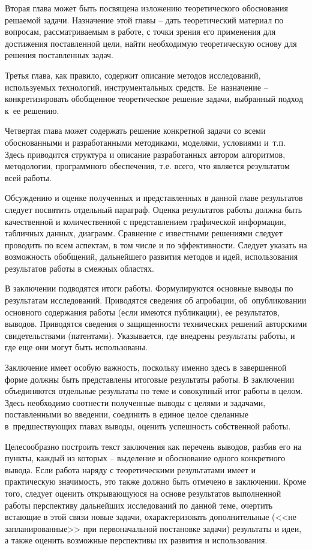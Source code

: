 \documentclass[PI,VKR]{HSEUniversityPractice}
\begin{document}
Вторая глава может быть посвящена изложению теоретического обоснования решаемой задачи. Назначение этой главы – дать теоретический материал по вопросам, рассматриваемым в работе, с точки зрения его применения для достижения поставленной цели, найти необходимую теоретическую основу для решения поставленных задач.

Третья глава, как правило, содержит описание методов исследований, используемых технологий, инструментальных средств. Ее назначение – конкретизировать обобщенное теоретическое решение задачи, выбранный подход к ее решению.

Четвертая глава может содержать решение конкретной задачи со всеми обоснованными и разработанными методиками, моделями, условиями и т.п. Здесь приводится структура и описание разработанных автором алгоритмов, методологии, программного обеспечения, т.е. всего, что является результатом всей работы.

Обсуждению и оценке полученных и представленных в данной главе результатов следует посвятить отдельный параграф. Оценка результатов работы должна быть качественной и количественной с представлением графической информации, табличных данных, диаграмм. Сравнение с известными решениями следует проводить по всем аспектам, в том числе и по эффективности. Следует указать на возможность обобщений, дальнейшего развития методов и идей, использования результатов работы в смежных областях.

В заключении подводятся итоги работы. Формулируются основные выводы по результатам исследований. Приводятся сведения об апробации, об опубликовании основного содержания работы (если имеются публикации), ее результатов, выводов. Приводятся сведения о защищенности технических решений авторскими свидетельствами (патентами). Указывается, где внедрены результаты работы, и где еще они могут быть использованы.

Заключение имеет особую важность, поскольку именно здесь в завершенной форме должны быть представлены итоговые результаты работы. В заключении объединяются отдельные результаты по теме и совокупный итог работы в целом. Здесь необходимо соотнести полученные выводы с целями и задачами, поставленными во введении, соединить в единое целое сделанные в предшествующих главах выводы, оценить успешность собственной работы.

Целесообразно построить текст заключения как перечень выводов, разбив его на пункты, каждый из которых – выделение и обоснование одного конкретного вывода. Если работа наряду с теоретическими результатами имеет и практическую значимость, это также должно быть отмечено в заключении.
Кроме того, следует оценить открывающуюся на основе результатов выполненной работы перспективу дальнейших исследований по данной теме, очертить встающие в этой связи новые задачи, охарактеризовать дополнительные (<<не запланированные>> при первоначальной постановке задачи) результаты и идеи, а также оценить возможные перспективы их развития и использования.
\end{document}
